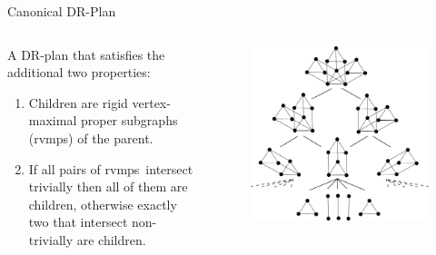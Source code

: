 \documentclass{mySlides}
\newcommand{\rvmps}{rvmps}
\begin{document}
\begin{frame}{Canonical DR-Plan}

    \begin{columns}
    \begin{column}{0.495\textwidth}
        \begin{definition}
            A DR-plan that satisfies the additional two properties:
            \begin{enumerate}
                \item Children are rigid vertex-maximal proper subgraphs (\rvmps) of the parent.
                \item If all pairs of \rvmps\ intersect trivially then all of them are children, otherwise exactly two that intersect non-trivially are children.
            \end{enumerate}
        \end{definition}

    \end{column}
    \begin{column}{0.475\textwidth}
        \begin{figure}\centering
            \includegraphics[width=\linewidth]{../../img/svg/3xc2c3_candrp_full}
        \end{figure}

    \end{column}
    \end{columns}

\end{frame}
\end{document}

